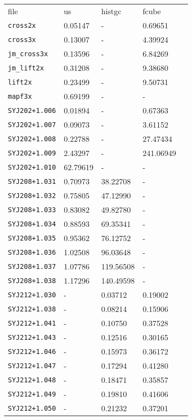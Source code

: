 \begin{tabular}{lllll}
file & us & histgc & fcube \\
\verb!cross2x! &
0.05147
&
-
&
0.69651
&
\\
\verb!cross3x! &
0.13007
&
-
&
4.39924
&
\\
\verb!jm_cross3x! &
0.13596
&
-
&
6.84269
&
\\
\verb!jm_lift2x! &
0.31208
&
-
&
9.38680
&
\\
\verb!lift2x! &
0.23499
&
-
&
9.50731
&
\\
\verb!mapf3x! &
0.69199
&
-
&
-
&
\\
\verb!SYJ202+1.006! &
0.01894
&
-
&
0.67363
&
\\
\verb!SYJ202+1.007! &
0.09073
&
-
&
3.61152
&
\\
\verb!SYJ202+1.008! &
0.22788
&
-
&
27.47434
&
\\
\verb!SYJ202+1.009! &
2.43297
&
-
&
241.06949
&
\\
\verb!SYJ202+1.010! &
62.79619
&
-
&
-
&
\\
\verb!SYJ208+1.031! &
0.70973
&
38.22708
&
-
&
\\
\verb!SYJ208+1.032! &
0.75805
&
47.12990
&
-
&
\\
\verb!SYJ208+1.033! &
0.83082
&
49.82780
&
-
&
\\
\verb!SYJ208+1.034! &
0.88593
&
69.35341
&
-
&
\\
\verb!SYJ208+1.035! &
0.95362
&
76.12752
&
-
&
\\
\verb!SYJ208+1.036! &
1.02508
&
96.03648
&
-
&
\\
\verb!SYJ208+1.037! &
1.07786
&
119.56508
&
-
&
\\
\verb!SYJ208+1.038! &
1.17296
&
140.49598
&
-
&
\\
\verb!SYJ212+1.030! &
-
&
0.03712
&
0.19002
&
\\
\verb!SYJ212+1.038! &
-
&
0.08214
&
0.15906
&
\\
\verb!SYJ212+1.041! &
-
&
0.10750
&
0.37528
&
\\
\verb!SYJ212+1.043! &
-
&
0.12516
&
0.30165
&
\\
\verb!SYJ212+1.046! &
-
&
0.15973
&
0.36172
&
\\
\verb!SYJ212+1.047! &
-
&
0.17294
&
0.41280
&
\\
\verb!SYJ212+1.048! &
-
&
0.18471
&
0.35857
&
\\
\verb!SYJ212+1.049! &
-
&
0.19810
&
0.41606
&
\\
\verb!SYJ212+1.050! &
-
&
0.21232
&
0.37201
&
\\
\end{tabular}
